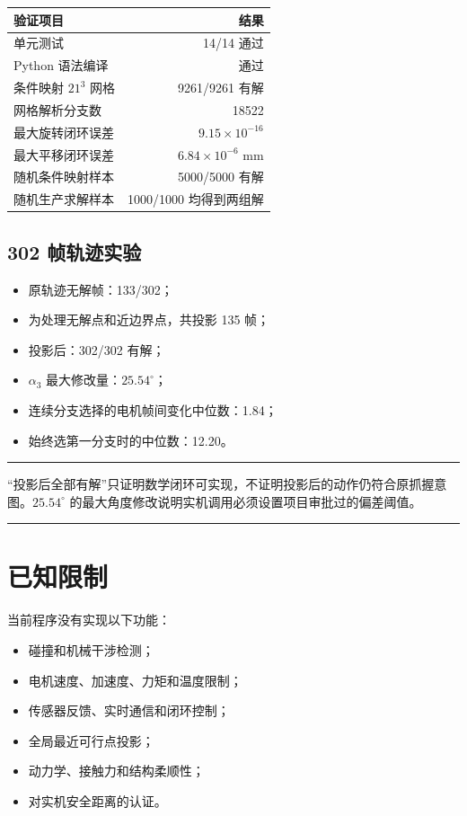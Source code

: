 \documentclass[11pt,a4paper,fontset=none]{ctexart}
\newenvironment{warningbox}{%
  \par\smallskip\noindent\begin{minipage}{\linewidth}%
  \color{SustechOrange}\rule{\linewidth}{0.8pt}\par\smallskip\color{Ink}%
}{%
  \par\smallskip\color{SustechOrange}\rule{\linewidth}{0.8pt}%
  \end{minipage}\par\smallskip%
}
\begin{document}
\begin{center}
\noindent\begin{tabularx}{\textwidth}{Xr}
\toprule
验证项目 & 结果\\
\midrule
单元测试 & 14/14 通过\\
Python 语法编译 & 通过\\
条件映射 $21^3$ 网格 & 9261/9261 有解\\
网格解析分支数 & 18522\\
最大旋转闭环误差 & $9.15\times10^{-16}$\\
最大平移闭环误差 & $6.84\times10^{-6}$ mm\\
随机条件映射样本 & 5000/5000 有解\\
随机生产求解样本 & 1000/1000 均得到两组解\\
\bottomrule
\end{tabularx}
\end{center}

\subsection{302 帧轨迹实验}

\begin{itemize}
  \item 原轨迹无解帧：133/302；
  \item 为处理无解点和近边界点，共投影 135 帧；
  \item 投影后：302/302 有解；
  \item $\alpha_3$ 最大修改量：$25.54^\circ$；
  \item 连续分支选择的电机帧间变化中位数：1.84；
  \item 始终选第一分支时的中位数：12.20。
\end{itemize}

\begin{warningbox}
“投影后全部有解”只证明数学闭环可实现，不证明投影后的动作仍符合原抓握意图。$25.54^\circ$ 的最大角度修改说明实机调用必须设置项目审批过的偏差阈值。
\end{warningbox}

\section{已知限制}

当前程序没有实现以下功能：

\begin{itemize}
  \item 碰撞和机械干涉检测；
  \item 电机速度、加速度、力矩和温度限制；
  \item 传感器反馈、实时通信和闭环控制；
  \item 全局最近可行点投影；
  \item 动力学、接触力和结构柔顺性；
  \item 对实机安全距离的认证。
\end{itemize}
\end{document}
